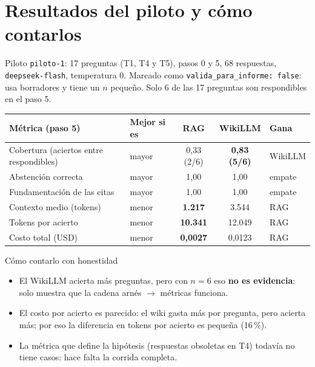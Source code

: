 \documentclass[11pt,a4paper]{article}
\newcommand{\cod}[1]{\texttt{\small #1}}
\begin{document}
\section{Resultados del piloto y cómo contarlos}

Piloto \cod{piloto-1}: 17 preguntas (T1, T4 y T5), pasos 0 y 5, 68 respuestas, \cod{deepseek-flash},
temperatura 0. Marcado como \cod{valida\_para\_informe: false}: usa borradores y tiene un $n$
pequeño. Solo 6 de las 17 preguntas son respondibles en el paso 5.

\begin{center}
\begin{tabular}{@{}l l c c l@{}}
\toprule
Métrica (paso 5) & Mejor si es & \textcolor{rag}{RAG} & \textcolor{wiki}{WikiLLM} & Gana \\
\midrule
Cobertura (aciertos entre respondibles) & mayor & 0,33 (2/6) & \textbf{0,83 (5/6)} & WikiLLM \\
Abstención correcta & mayor & 1,00 & 1,00 & empate \\
Fundamentación de las citas & mayor & 1,00 & 1,00 & empate \\
Contexto medio (tokens) & menor & \textbf{1.217} & 3.544 & RAG \\
Tokens por acierto & menor & \textbf{10.341} & 12.049 & RAG \\
Costo total (USD) & menor & \textbf{0,0027} & 0,0123 & RAG \\
\bottomrule
\end{tabular}
\end{center}

\begin{clave}{Cómo contarlo con honestidad}
\begin{itemize}[leftmargin=12pt]
  \item El WikiLLM acierta más preguntas, pero con $n=6$ eso \textbf{no es evidencia}: solo muestra
        que la cadena arnés $\rightarrow$ métricas funciona.
  \item El costo por acierto es parecido: el wiki gasta más por pregunta, pero acierta más; por eso
        la diferencia en tokens por acierto es pequeña (16\,\%).
  \item La métrica que define la hipótesis (respuestas obsoletas en T4) todavía no tiene casos: hace
        falta la corrida completa.
\end{itemize}
\end{clave}
\end{document}
